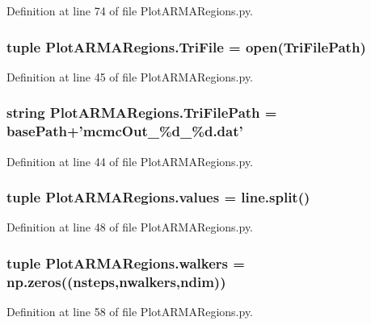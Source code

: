 Definition at line 74 of file Plot\-A\-R\-M\-A\-Regions.\-py.

\hypertarget{namespace_plot_a_r_m_a_regions_a418058aa77527961189e1d40f3d8091d}{
\subsubsection[{Tri\-File}]{\setlength{\rightskip}{0pt plus 5cm}tuple Plot\-A\-R\-M\-A\-Regions.\-Tri\-File = open({\bf Tri\-File\-Path})}}\label{namespace_plot_a_r_m_a_regions_a418058aa77527961189e1d40f3d8091d}


Definition at line 45 of file Plot\-A\-R\-M\-A\-Regions.\-py.

\hypertarget{namespace_plot_a_r_m_a_regions_a35b8724b6b0849cfed30c080d79c775e}{
\subsubsection[{Tri\-File\-Path}]{\setlength{\rightskip}{0pt plus 5cm}string Plot\-A\-R\-M\-A\-Regions.\-Tri\-File\-Path = base\-Path+'mcmc\-Out\-\_\-\%d\-\_\-\%d.\-dat'}}\label{namespace_plot_a_r_m_a_regions_a35b8724b6b0849cfed30c080d79c775e}


Definition at line 44 of file Plot\-A\-R\-M\-A\-Regions.\-py.

\hypertarget{namespace_plot_a_r_m_a_regions_a4e1eb2c62fce8e30d2ac6b5152291a8a}{
\subsubsection[{values}]{\setlength{\rightskip}{0pt plus 5cm}tuple Plot\-A\-R\-M\-A\-Regions.\-values = line.\-split()}}\label{namespace_plot_a_r_m_a_regions_a4e1eb2c62fce8e30d2ac6b5152291a8a}


Definition at line 48 of file Plot\-A\-R\-M\-A\-Regions.\-py.

\hypertarget{namespace_plot_a_r_m_a_regions_a3c04a644963d85e8e23169a93ce616be}{
\subsubsection[{walkers}]{\setlength{\rightskip}{0pt plus 5cm}tuple Plot\-A\-R\-M\-A\-Regions.\-walkers = np.\-zeros(({\bf nsteps},{\bf nwalkers},{\bf ndim}))}}\label{namespace_plot_a_r_m_a_regions_a3c04a644963d85e8e23169a93ce616be}


Definition at line 58 of file Plot\-A\-R\-M\-A\-Regions.\-py.

